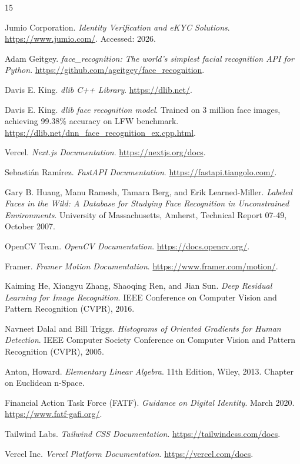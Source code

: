 \documentclass[12pt,a4paper]{article}
\begin{document}
\begin{thebibliography}{15}

Jumio Corporation. \textit{Identity Verification and eKYC Solutions}. \url{https://www.jumio.com/}. Accessed: 2026.

Adam Geitgey. \textit{face\_recognition: The world's simplest facial recognition API for Python}. \url{https://github.com/ageitgey/face_recognition}.

Davis E. King. \textit{dlib C++ Library}. \url{https://dlib.net/}.

Davis E. King. \textit{dlib face recognition model}. Trained on 3 million face images, achieving 99.38\% accuracy on LFW benchmark. \url{https://dlib.net/dnn_face_recognition_ex.cpp.html}.

Vercel. \textit{Next.js Documentation}. \url{https://nextjs.org/docs}.

Sebastián Ramírez. \textit{FastAPI Documentation}. \url{https://fastapi.tiangolo.com/}.

Gary B. Huang, Manu Ramesh, Tamara Berg, and Erik Learned-Miller. \textit{Labeled Faces in the Wild: A Database for Studying Face Recognition in Unconstrained Environments}. University of Massachusetts, Amherst, Technical Report 07-49, October 2007.

OpenCV Team. \textit{OpenCV Documentation}. \url{https://docs.opencv.org/}.

Framer. \textit{Framer Motion Documentation}. \url{https://www.framer.com/motion/}.

Kaiming He, Xiangyu Zhang, Shaoqing Ren, and Jian Sun. \textit{Deep Residual Learning for Image Recognition}. IEEE Conference on Computer Vision and Pattern Recognition (CVPR), 2016.

Navneet Dalal and Bill Triggs. \textit{Histograms of Oriented Gradients for Human Detection}. IEEE Computer Society Conference on Computer Vision and Pattern Recognition (CVPR), 2005.

Anton, Howard. \textit{Elementary Linear Algebra}. 11th Edition, Wiley, 2013. Chapter on Euclidean n-Space.

Financial Action Task Force (FATF). \textit{Guidance on Digital Identity}. March 2020. \url{https://www.fatf-gafi.org/}.

Tailwind Labs. \textit{Tailwind CSS Documentation}. \url{https://tailwindcss.com/docs}.

Vercel Inc. \textit{Vercel Platform Documentation}. \url{https://vercel.com/docs}.

\end{thebibliography}
\end{document}
